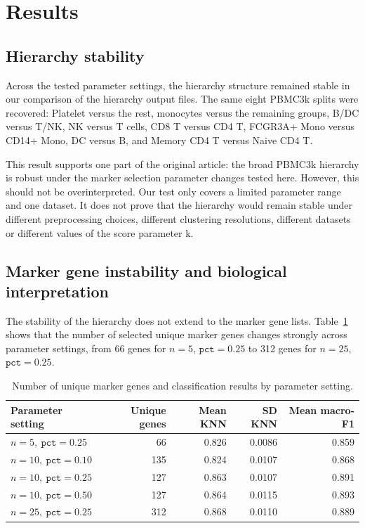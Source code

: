 \documentclass[11pt,a4paper]{article}
\begin{document}
\section{Results}

\subsection{Hierarchy stability}

Across the tested parameter settings, the hierarchy structure remained stable in our comparison of the hierarchy output files.
The same eight PBMC3k splits were recovered: Platelet versus the rest, monocytes versus the remaining groups, B/DC versus T/NK, NK versus T cells, CD8 T versus CD4 T, FCGR3A+ Mono versus CD14+ Mono, DC versus B, and Memory CD4 T versus Naive CD4 T.

This result supports one part of the original article: the broad PBMC3k hierarchy is robust under the marker selection parameter changes tested here.
However, this should not be overinterpreted.
Our test only covers a limited parameter range and one dataset.
It does not prove that the hierarchy would remain stable under different preprocessing choices, different clustering resolutions, different datasets or different values of the score parameter k.

\subsection{Marker gene instability and biological interpretation}

The stability of the hierarchy does not extend to the marker gene lists.
Table~\ref{tab:gene_counts} shows that the number of selected unique marker genes changes strongly across parameter settings, from 66 genes for $n=5$, $\texttt{pct}=0.25$ to 312 genes for $n=25$, $\texttt{pct}=0.25$.

\begin{table}[H]
\centering
\caption{Number of unique marker genes and classification results by parameter setting.}
\label{tab:gene_counts}
\begin{tabular}{lrrrr}
\toprule
Parameter setting & Unique genes & Mean KNN & SD KNN & Mean macro-F1 \\
\midrule
$n=5,\ \texttt{pct}=0.25$ & 66 & 0.826 & 0.0086 & 0.859 \\
$n=10,\ \texttt{pct}=0.10$ & 135 & 0.824 & 0.0107 & 0.868 \\
$n=10,\ \texttt{pct}=0.25$ & 127 & 0.863 & 0.0107 & 0.891 \\
$n=10,\ \texttt{pct}=0.50$ & 127 & 0.864 & 0.0115 & 0.893 \\
$n=25,\ \texttt{pct}=0.25$ & 312 & 0.868 & 0.0110 & 0.889 \\
\bottomrule
\end{tabular}
\end{table}
\end{document}
